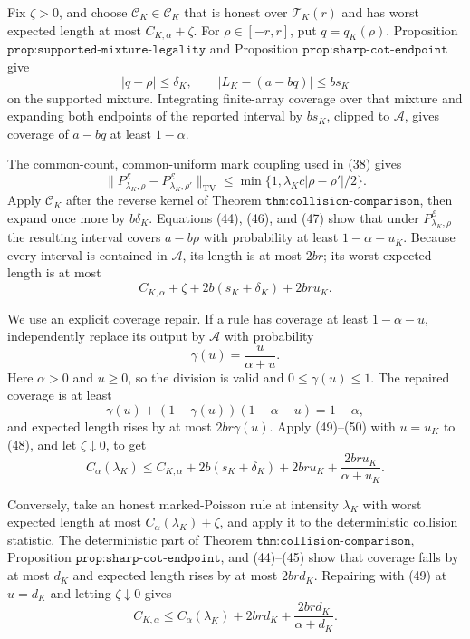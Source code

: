 Fix \(\zeta>0\), and choose
\(\mathcal C_K\in\mathscr C_K\) that is honest over
\(\mathcal T_K(r)\) and has worst expected length at most
\(C_{K,\alpha}+\zeta\).  For \(\rho\in[-r,r]\), put
\(q=q_K(\rho)\).  Proposition
\(\texttt{prop:supported-mixture-legality}\) and Proposition
\(\texttt{prop:sharp-cot-endpoint}\) give
\[
 |q-\rho|\le\delta_K,
 \qquad
 |L_K-(a-bq)|\le bs_K
 \tag{46}
\]
on the supported mixture.  Integrating finite-array coverage over that
mixture and expanding both endpoints of the reported interval by
\(bs_K\), clipped to \(\mathcal A\), gives coverage of \(a-bq\) at
least \(1-\alpha\).

The common-count, common-uniform mark coupling used in (38) gives
\[
 \|P^{\mathcal E}_{\lambda_K,\rho}
 -P^{\mathcal E}_{\lambda_K,\rho'}\|_{\mathrm{TV}}
 \le\min\{1,\lambda_Kc|\rho-\rho'|/2\}.
 \tag{47}
\]
Apply \(\mathcal C_K\) after the reverse kernel of Theorem
\(\texttt{thm:collision-comparison}\), then expand once more by
\(b\delta_K\).  Equations (44), (46), and (47) show that under
\(P^{\mathcal E}_{\lambda_K,\rho}\) the resulting interval covers
\(a-b\rho\) with probability at least \(1-\alpha-u_K\).  Because every
interval is contained in \(\mathcal A\), its length is at most \(2br\);
its worst expected length is at most
\[
 C_{K,\alpha}+\zeta+2b(s_K+\delta_K)+2bru_K.
 \tag{48}
\]

We use an explicit coverage repair.  If a rule has coverage at least
\(1-\alpha-u\), independently replace its output by \(\mathcal A\)
with probability
\[
 \gamma(u)=\frac{u}{\alpha+u}.
 \tag{49}
\]
Here \(\alpha>0\) and \(u\ge0\), so the division is valid and
\(0\le\gamma(u)\le1\).  The repaired coverage is at least
\[
 \gamma(u)+(1-\gamma(u))(1-\alpha-u)=1-\alpha,
 \tag{50}
\]
and expected length rises by at most \(2br\gamma(u)\).  Apply
(49)--(50) with \(u=u_K\) to (48), and let \(\zeta\downarrow0\), to get
\[
 C_\alpha(\lambda_K)
 \le C_{K,\alpha}+2b(s_K+\delta_K)+2bru_K
 +\frac{2bru_K}{\alpha+u_K}.
 \tag{51}
\]

Conversely, take an honest marked-Poisson rule at intensity
\(\lambda_K\) with worst expected length at most
\(C_\alpha(\lambda_K)+\zeta\), and apply it to the deterministic
collision statistic.  The deterministic part of Theorem
\(\texttt{thm:collision-comparison}\), Proposition
\(\texttt{prop:sharp-cot-endpoint}\), and (44)--(45) show that coverage
falls by at most \(d_K\) and expected length rises by at most
\(2brd_K\).  Repairing with (49) at \(u=d_K\) and letting
\(\zeta\downarrow0\) gives
\[
 C_{K,\alpha}
 \le C_\alpha(\lambda_K)+2brd_K
 +\frac{2brd_K}{\alpha+d_K}.
 \tag{52}
\]

